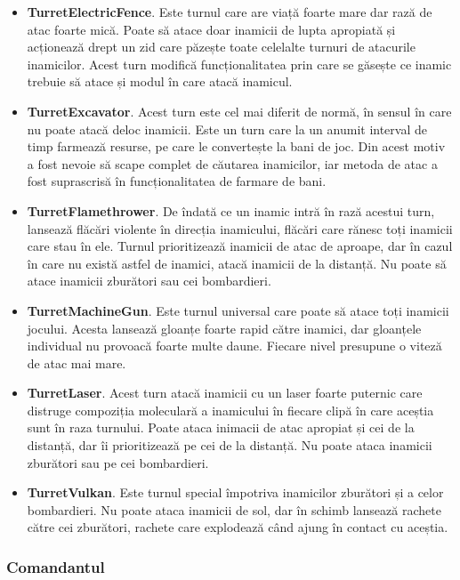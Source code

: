 \documentclass[12pt, a4paper]{article}
\begin{document}
	\begin{itemize}
		\item \textbf{TurretElectricFence}. Este turnul care are viață foarte mare dar rază de atac foarte mică. Poate să atace doar inamicii de lupta apropiată și acționează drept un zid care păzește toate celelalte turnuri de atacurile inamicilor. Acest turn modifică funcționalitatea prin care se găsește ce inamic trebuie să atace și modul în care atacă inamicul.
		\item \textbf{TurretExcavator}. Acest turn este cel mai diferit de normă, în sensul în care nu poate atacă deloc inamicii. Este un turn care la un anumit interval de timp farmează resurse, pe care le convertește la bani de joc. Din acest motiv a fost nevoie să scape complet de căutarea inamicilor, iar metoda de atac a fost suprascrisă în funcționalitatea de farmare de bani.
		\item \textbf{TurretFlamethrower}. De îndată ce un inamic intră în rază acestui turn, lansează flăcări violente în direcția inamicului, flăcări care rănesc toți inamicii care stau în ele. Turnul prioritizează inamicii de atac de aproape, dar în cazul în care nu există astfel de inamici, atacă inamicii de la distanță. Nu poate să atace inamicii zburători sau cei bombardieri.
		\item \textbf{TurretMachineGun}. Este turnul universal care poate să atace toți inamicii jocului. Acesta lansează gloanțe foarte rapid către inamici, dar gloanțele individual nu provoacă foarte multe daune. Fiecare nivel presupune o viteză de atac mai mare.
		\item \textbf{TurretLaser}. Acest turn atacă inamicii cu un laser foarte puternic care distruge compoziția moleculară a inamicului în fiecare clipă în care aceștia sunt în raza turnului. Poate ataca inimacii de atac apropiat și cei de la distanță, dar îi prioritizează pe cei de la distanță. Nu poate ataca inamicii zburători sau pe cei bombardieri.
		\item \textbf{TurretVulkan}. Este turnul special împotriva inamicilor zburători și a celor bombardieri. Nu poate ataca inamicii de sol, dar în schimb lansează rachete către cei zburători, rachete care explodează când ajung în contact cu aceștia.
	\end{itemize}
	
	
	
	
	
	\subsubsection{Comandantul}
	\label{section: commander}
	
\end{document}
